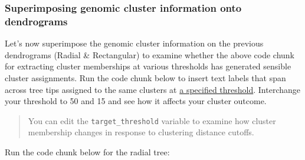 \documentclass[
]{book}
\begin{document}
\subsubsection{Superimposing genomic cluster information onto dendrograms}\label{superimposing-genomic-cluster-information-onto-dendrograms}

Let's now superimpose the genomic cluster information on the previous dendrograms (Radial \& Rectangular) to examine whether the above code chunk for extracting cluster memberships at various thresholds has generated sensible cluster assignments. Run the code chunk below to insert text labels that span across tree tips assigned to the same clusters at \ul{a specified threshold}. Interchange your threshold to 50 and 15 and see how it affects your cluster outcome.

\begin{quote}
You can edit the \texttt{target\_threshold} variable to examine how cluster membership changes in response to clustering distance cutoffs.
\end{quote}

Run the code chunk below for the radial tree:
\end{document}
